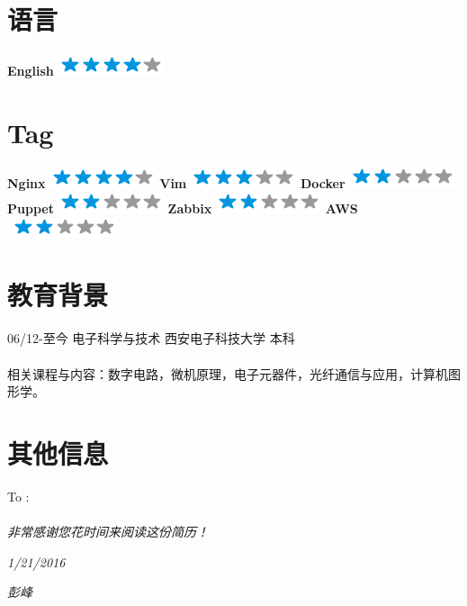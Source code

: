 \documentclass[]{friggeri-cv}
\begin{document}
\begin{aside}
~
~
  \section{语言}
    \textbf{English}\includegraphics[scale=0.40]{img/4stars.png}
  ~    
  \section{Tag}
  \textbf{Nginx}\includegraphics[scale=0.40]{img/4stars.png}
  \textbf{Vim}\includegraphics[scale=0.40]{img/3stars.png}
  \textbf{Docker}\includegraphics[scale=0.40]{img/2stars.png}
  \textbf{Puppet}\includegraphics[scale=0.40]{img/2stars.png}
  \textbf{Zabbix}\includegraphics[scale=0.40]{img/2stars.png}
  \textbf{AWS}\includegraphics[scale=0.40]{img/2stars.png}
  ~
\end{aside}




\section{教育背景}
06/12\hspace{1mm}-\hspace{1mm}至今 \hspace{30mm} 电子科学与技术 \hspace{7mm}  西安电子科技大学  \hspace{7mm}  本科 \\
 \\
相关课程与内容：数字电路，微机原理，电子元器件，光纤通信与应用，计算机图形学。\\


\section{其他信息}
To :\\
\emph{
\\

非常感谢您花时间来阅读这份简历！\\
}

\begin{flushleft}
\emph{1/21/2016}
\end{flushleft}
\begin{flushright}
\emph{彭峰}
\end{flushright}
\end{document}
